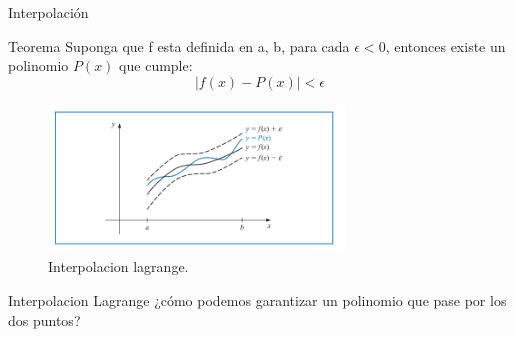 \documentclass{beamer}
\begin{document}
\begin{frame}{Interpolación}

\begin{block}{Teorema}
Suponga que f esta definida en a, b, para cada $\epsilon<0$, entonces
existe un polinomio $P(x)$ que cumple:
    \begin{equation}
    |f(x)-P(x)|<\epsilon
    \end{equation}
    \end{block}
    
    \begin{center}
    \begin{figure}
    \includegraphics[width=0.7\textwidth]{lagrange01.png}
    \caption{Interpolacion lagrange.} 
    \end{figure} 
    \end{center}
\end{frame}


\begin{frame}{Interpolacion Lagrange}
¿cómo podemos garantizar un polinomio que pase por los dos puntos?
   \begin{center}
  \end{center}
    
\end{frame}
\end{document}
